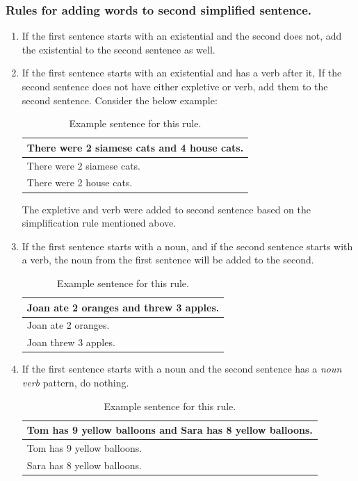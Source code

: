 \documentclass[11pt]{article}
\begin{document}
\subsubsection{Rules for adding words to second simplified sentence.}
\begin{enumerate}
 \item 
If the first sentence starts with an existential and the second does not, add the existential to the second sentence as well.

\item 
If the first sentence starts with an existential and has a verb after it, If the second sentence does not have either expletive or verb, add them to the second sentence. Consider the below example:

\begin{table}[h!]
\centering
\begin{tabular}{ | m{25em} | }
\hline
 \textbf{There were 2 siamese cats and 4 house cats.}\\
\hline
There were 2 siamese cats.\\
\hline
There were 2 house cats.\\
\hline
\end{tabular}
\caption{Example sentence for this rule.}
\label{table:9}
\end{table}

The expletive and verb were added to second sentence based on the simplification rule mentioned above.

\item
If the first sentence starts with a noun, and if the second sentence starts with a verb, the noun from the first sentence will be added to the second.

\begin{table}[h!]
\centering
\begin{tabular}{ | m{25em} | }
\hline
 \textbf{Joan ate 2 oranges and threw 3 apples.}\\
\hline
Joan ate 2 oranges.\\
\hline
Joan threw 3 apples.\\
\hline
\end{tabular}
\caption{Example sentence for this rule.}
\label{table:10}
\end{table}

\item 
If the first sentence starts with a noun and the second sentence has a \textit{noun verb} pattern, do nothing.

\begin{table}[h!]
\centering
\begin{tabular}{ | m{25em} | }
\hline
 \textbf{Tom has 9 yellow balloons and Sara has 8 yellow balloons.}\\
\hline
Tom has 9 yellow balloons.\\
\hline
Sara has 8 yellow balloons.\\
\hline
\end{tabular}
\caption{Example sentence for this rule.}
\label{table:11}
\end{table}


\end{enumerate}
\end{document}

